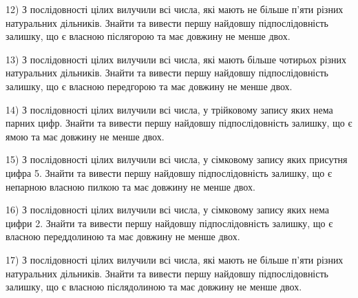 \documentclass[11pt, ukrainian]{article}
\begin{document}
\par
\vspace{0.9cm}
12) \space 
З послідовності цілих вилучили всі числа, які мають не більше п'яти різних натуральних дільників. Знайти та вивести першу найдовшу підпослідовність залишку, що є власною післягорою та має довжину не менше двох.

\par
\vspace{0.9cm}
13) \space 
З послідовності цілих вилучили всі числа, які мають більше чотирьох різних натуральних дільників. Знайти та вивести першу найдовшу підпослідовність залишку, що є власною передгорою та має довжину не менше двох.

\par
\vspace{0.9cm}
14) \space 
З послідовності цілих вилучили всі числа, у трійковому запису яких нема парних цифр. Знайти та вивести першу найдовшу підпослідовність залишку, що є ямою та має довжину не менше двох.

\par
\vspace{0.9cm}
15) \space 
З послідовності цілих вилучили всі числа, у сімковому запису яких присутня цифра 5. Знайти та вивести першу найдовшу підпослідовність залишку, що є непарною власною пилкою та має довжину не менше двох.

\par
\vspace{0.9cm}
16) \space 
З послідовності цілих вилучили всі числа, у сімковому запису яких нема цифри 2. Знайти та вивести першу найдовшу підпослідовність залишку, що є власною переддолиною та має довжину не менше двох.

\par
\vspace{0.9cm}
17) \space 
З послідовності цілих вилучили всі числа, які мають не більше п'яти різних натуральних дільників. Знайти та вивести першу найдовшу підпослідовність залишку, що є власною післядолиною та має довжину не менше двох.
\end{document}
